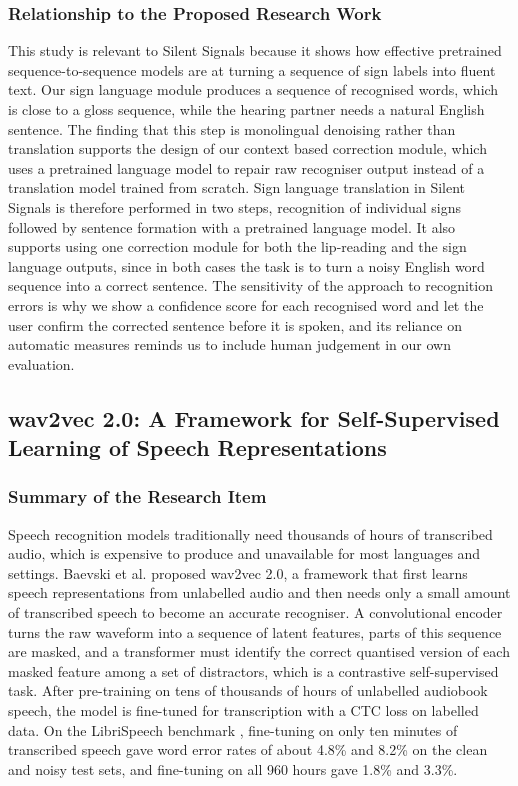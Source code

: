 \documentclass{FastFyp}
\begin{document}
\subsubsection*{Relationship to the Proposed Research Work}
This study is relevant to Silent Signals because it shows how effective pretrained sequence-to-sequence models are at turning a sequence of sign labels into fluent text. Our sign language module produces a sequence of recognised words, which is close to a gloss sequence, while the hearing partner needs a natural English sentence. The finding that this step is monolingual denoising rather than translation supports the design of our context based correction module, which uses a pretrained language model to repair raw recogniser output instead of a translation model trained from scratch. Sign language translation in Silent Signals is therefore performed in two steps, recognition of individual signs followed by sentence formation with a pretrained language model. It also supports using one correction module for both the lip-reading and the sign language outputs, since in both cases the task is to turn a noisy English word sequence into a correct sentence. The sensitivity of the approach to recognition errors is why we show a confidence score for each recognised word and let the user confirm the corrected sentence before it is spoken, and its reliance on automatic measures reminds us to include human judgement in our own evaluation.

\subsection{wav2vec 2.0: A Framework for Self-Supervised Learning of Speech Representations}
\subsubsection*{Summary of the Research Item}
Speech recognition models traditionally need thousands of hours of transcribed audio, which is expensive to produce and unavailable for most languages and settings. Baevski et al. \cite{baevski2020wav2vec} proposed wav2vec 2.0, a framework that first learns speech representations from unlabelled audio and then needs only a small amount of transcribed speech to become an accurate recogniser. A convolutional encoder turns the raw waveform into a sequence of latent features, parts of this sequence are masked, and a transformer must identify the correct quantised version of each masked feature among a set of distractors, which is a contrastive self-supervised task. After pre-training on tens of thousands of hours of unlabelled audiobook speech, the model is fine-tuned for transcription with a CTC loss on labelled data. On the LibriSpeech benchmark \cite{panayotov2015librispeech}, fine-tuning on only ten minutes of transcribed speech gave word error rates of about 4.8\% and 8.2\% on the clean and noisy test sets, and fine-tuning on all 960 hours gave 1.8\% and 3.3\%.
\end{document}
